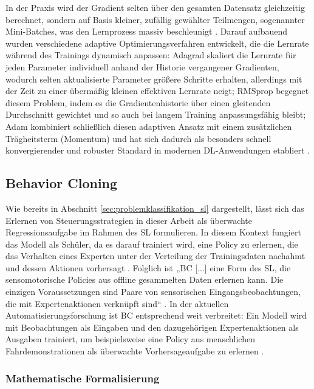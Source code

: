 In der Praxis wird der Gradient selten über den gesamten Datensatz gleichzeitig berechnet, sondern auf Basis kleiner, zufällig gewählter Teilmengen, sogenannter Mini-Batches, was den Lernprozess massiv beschleunigt \cite[vgl.~S.~277]{chap2_Goo16}. 
Darauf aufbauend wurden verschiedene adaptive Optimierungsverfahren entwickelt, die die Lernrate während des Trainings dynamisch anpassen: \gls{Adagrad} skaliert die Lernrate für jeden Parameter individuell anhand der Historie vergangener Gradienten, wodurch selten aktualisierte Parameter größere Schritte erhalten, allerdings mit der Zeit zu einer übermäßig kleinen effektiven Lernrate neigt; \gls{RMSprop} begegnet diesem Problem, indem es die Gradientenhistorie über einen gleitenden Durchschnitt gewichtet und so auch bei langem Training anpassungsfähig bleibt; \gls{Adam} kombiniert schließlich diesen adaptiven Ansatz mit einem zusätzlichen Trägheitsterm (Momentum) und hat sich dadurch als besonders schnell konvergierender und robuster Standard in modernen \gls{DL}-Anwendungen etabliert \cite[vgl.~S.~305--308]{chap2_Goo16}.

\subsection{Behavior Cloning}

Wie bereits in Abschnitt \ref{sec:problemklassifikation_sl} dargestellt, lässt sich das Erlernen von Steuerungsstrategien in dieser Arbeit als überwachte Regressionsaufgabe im Rahmen des \gls{SL} formulieren. 
In diesem Kontext fungiert das Modell als Schüler, da es darauf trainiert wird, eine Policy zu erlernen, die das Verhalten eines Experten unter der Verteilung der Trainingsdaten nachahmt und dessen Aktionen vorhersagt \cite[vgl.~S.~2f.]{chap2_Ros10}. 
Folglich ist „\gls{BC} [...] eine Form des \gls{SL}, die sensomotorische Policies aus offline gesammelten Daten erlernen kann. 
Die einzigen Voraussetzungen sind Paare von sensorischen Eingangsbeobachtungen, die mit Expertenaktionen verknüpft sind“ \cite[S.~9330]{chap2_Cod19}. 
In der aktuellen Automatisierungsforschung ist \gls{BC} entsprechend weit verbreitet: Ein Modell wird mit Beobachtungen als Eingaben und den dazugehörigen Expertenaktionen als Ausgaben trainiert, um beispielsweise eine Policy aus menschlichen Fahrdemonstrationen als überwachte Vorhersageaufgabe zu erlernen \cite[vgl.~S.~1f.]{chap2_Kar25}.

\subsubsection{Mathematische Formalisierung}

